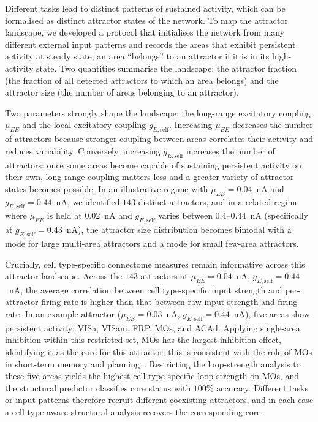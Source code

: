 \documentclass[11pt]{article}
\begin{document}
Different tasks lead to distinct patterns of sustained activity, which can be formalised as distinct attractor states of the network. To map the attractor landscape, we developed a protocol that initialises the network from many different external input patterns and records the areas that exhibit persistent activity at steady state; an area ``belongs'' to an attractor if it is in its high-activity state. Two quantities summarise the landscape: the attractor fraction (the fraction of all detected attractors to which an area belongs) and the attractor size (the number of areas belonging to an attractor).

Two parameters strongly shape the landscape: the long-range excitatory coupling $\mu_{EE}$ and the local excitatory coupling $g_{E,\text{self}}$. Increasing $\mu_{EE}$ decreases the number of attractors because stronger coupling between areas correlates their activity and reduces variability. Conversely, increasing $g_{E,\text{self}}$ increases the number of attractors: once some areas become capable of sustaining persistent activity on their own, long-range coupling matters less and a greater variety of attractor states becomes possible. In an illustrative regime with $\mu_{EE}=0.04$~nA and $g_{E,\text{self}}=0.44$~nA, we identified $143$ distinct attractors, and in a related regime where $\mu_{EE}$ is held at $0.02$~nA and $g_{E,\text{self}}$ varies between $0.4$--$0.44$~nA (specifically at $g_{E,\text{self}}=0.43$~nA), the attractor size distribution becomes bimodal with a mode for large multi-area attractors and a mode for small few-area attractors.

Crucially, cell type-specific connectome measures remain informative across this attractor landscape. Across the $143$ attractors at $\mu_{EE}=0.04$~nA, $g_{E,\text{self}}=0.44$~nA, the average correlation between cell type-specific input strength and per-attractor firing rate is higher than that between raw input strength and firing rate. In an example attractor ($\mu_{EE}=0.03$~nA, $g_{E,\text{self}}=0.44$~nA), five areas show persistent activity: VISa, VISam, FRP, MOs, and ACAd. Applying single-area inhibition within this restricted set, MOs has the largest inhibition effect, identifying it as the core for this attractor; this is consistent with the role of MOs in short-term memory and planning~\cite{inagaki2019discrete,gilad2018behavioral}. Restricting the loop-strength analysis to these five areas yields the highest cell type-specific loop strength on MOs, and the structural predictor classifies core status with $100\%$ accuracy. Different tasks or input patterns therefore recruit different coexisting attractors, and in each case a cell-type-aware structural analysis recovers the corresponding core.
\end{document}
